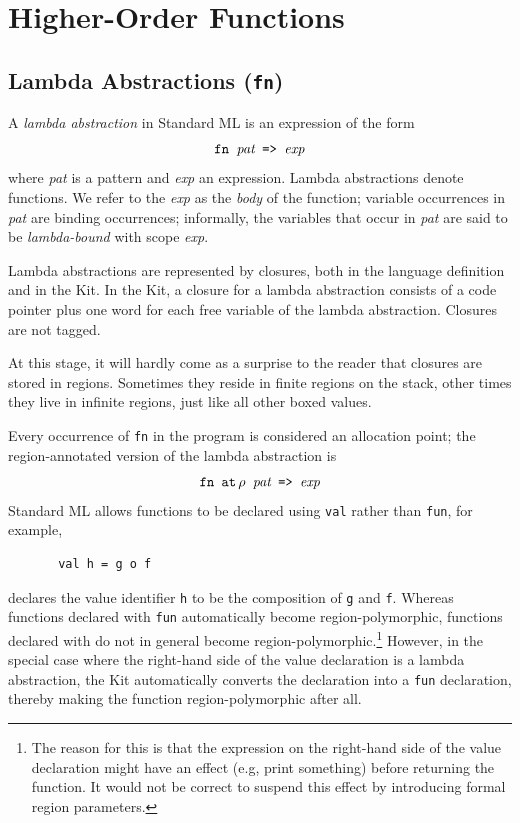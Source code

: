 \documentclass[12pt]{book}
\begin{document}
\chapter{Higher-Order Functions}
\label{hof.sec}
%
\section{Lambda Abstractions ({\tt fn})}
A {\em lambda abstraction} 
%
in Standard ML is an expression of the
form 
$$\hbox{\tt fn {\it pat} => {\it exp}}$$
where {\it pat} is a pattern and {\it exp} an expression.
Lambda abstractions denote functions. We refer to the {\it exp} as the
{\em body} of the function; variable occurrences in {\it pat} are
binding occurrences; informally, the variables that occur
in {\it pat} are said to be {\em lambda-bound} with scope 
{\it exp}. 

Lambda abstractions are represented by closures, both in the language
definition and in the Kit. In the Kit, a closure for a lambda abstraction
consists of a code pointer plus one word for each free variable of the
lambda abstraction. Closures are not tagged. 

At this stage, it will hardly come as a surprise to the reader that closures are stored
in regions.  Sometimes they reside in finite regions on the stack, other times
they live in infinite regions, just like all other boxed values.

Every occurrence of {\tt fn} in the program is considered 
an allocation point; the region-annotated version of the lambda abstraction is
$$\hbox{\tt fn $\mathbin{\hbox{\tt at}}\,\rho$ {\it pat} => {\it exp}}$$
Standard ML allows  functions to be declared using {\tt val} rather than {\tt fun}, for example, 
\begin{verbatim}
       val h = g o f
\end{verbatim}
declares the value identifier {\tt h} to be the composition of {\tt g}
and {\tt f}.  Whereas functions declared with 
%
{\tt fun} automatically become region-polymorphic, functions
declared with  do not in general become
%
region-polymorphic.\footnote{The reason for this is that the
  expression on the right-hand side of the value declaration might
  have an effect (e.g, print something) before returning the function.
  It would not be correct to suspend this effect by introducing formal
  region parameters.} However, in the special case where the
right-hand side of the value declaration is a
%
lambda abstraction, the Kit automatically converts the declaration
into a {\tt fun} declaration, thereby making the function
region-polymorphic after all.
\end{document}
